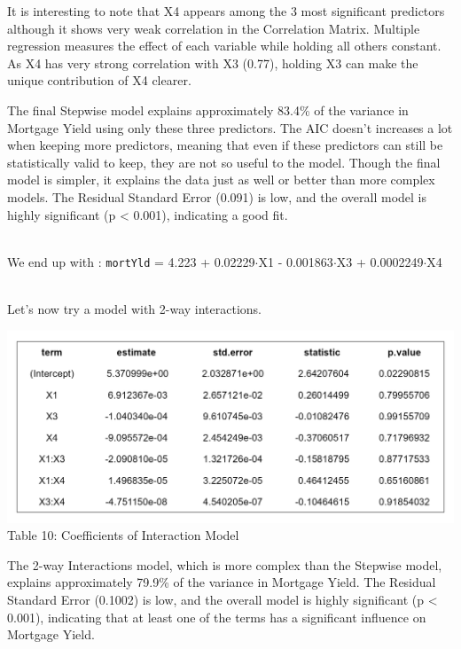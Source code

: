 \documentclass[
  11pt,
]{article}
\begin{document}
It is interesting to note that X4 appears among the 3 most significant
predictors although it shows very weak correlation in the Correlation
Matrix. Multiple regression measures the effect of each variable while
holding all others constant. As X4 has very strong correlation with X3
(0.77), holding X3 can make the unique contribution of X4 clearer.

The final Stepwise model explains approximately 83.4\% of the variance
in Mortgage Yield using only these three predictors. The AIC doesn't
increases a lot when keeping more predictors, meaning that even if these
predictors can still be statistically valid to keep, they are not so
useful to the model. Though the final model is simpler, it explains the
data just as well or better than more complex models. The Residual
Standard Error (0.091) is low, and the overall model is highly
significant (p \textless{} 0.001), indicating a good fit.\\
\strut \\
We end up with : \texttt{mortYld} = 4.223 + 0.02229\(\cdot\)X1 -
0.001863\(\cdot\)X3 + 0.0002249\(\cdot\)X4\\
\strut \\
Let's now try a model with 2-way interactions.

\begin{minipage}{0.4\textwidth}
\includegraphics[width=1.5\linewidth]{interaction_model_coef.png}
\vspace{0.3em}
\small Table 10: Coefficients of Interaction Model
\end{minipage}
\hfill
\begin{minipage}{0.35\textwidth}
\small
The 2-way Interactions model, which is more complex than the Stepwise
model, explains approximately 79.9\% of the variance in Mortgage Yield.
The Residual Standard Error (0.1002) is low, and the overall model is
highly significant (p < 0.001), indicating that at least one of the
terms has a significant influence on Mortgage Yield.
\end{minipage}
\end{document}
